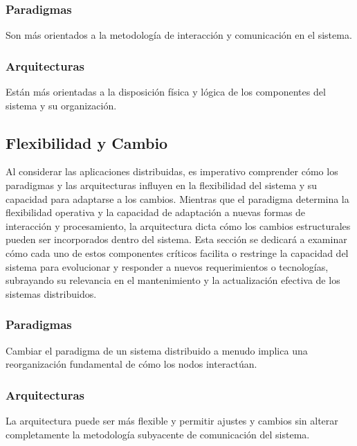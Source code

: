 \subsubsection{Paradigmas}
Son más orientados a la metodología de interacción y comunicación en el sistema.

\subsubsection{Arquitecturas}
Están más orientadas a la disposición física y lógica de los componentes del sistema y su organización.

\subsection{Flexibilidad y Cambio}
Al considerar las aplicaciones distribuidas, es imperativo comprender cómo los paradigmas y las arquitecturas influyen en la flexibilidad del sistema y su capacidad para adaptarse a los cambios. Mientras que el paradigma determina la flexibilidad operativa y la capacidad de adaptación a nuevas formas de interacción y procesamiento, la arquitectura dicta cómo los cambios estructurales pueden ser incorporados dentro del sistema. Esta sección se dedicará a examinar cómo cada uno de estos componentes críticos facilita o restringe la capacidad del sistema para evolucionar y responder a nuevos requerimientos o tecnologías, subrayando su relevancia en el mantenimiento y la actualización efectiva de los sistemas distribuidos.

\subsubsection{Paradigmas}
Cambiar el paradigma de un sistema distribuido a menudo implica una reorganización fundamental de cómo los nodos interactúan.

\subsubsection{Arquitecturas}
La arquitectura puede ser más flexible y permitir ajustes y cambios sin alterar completamente la metodología subyacente de comunicación del sistema.

